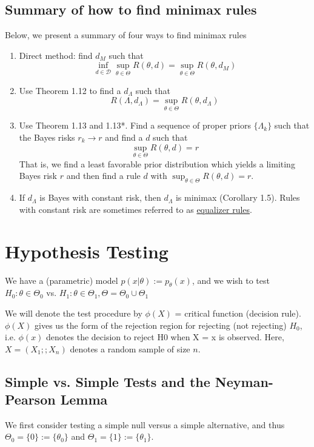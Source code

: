 \documentclass[12pt]{article}
\numberwithin{equation}{section}
\begin{document}
\subsection{Summary of how to find minimax rules}
Below, we present a summary of four ways to find minimax rules
\begin{enumerate}
  \item Direct method: find $d_M$ such that
  \begin{equation*}
    \inf_{d \in \mathcal{D}} \sup_{\theta \in \Theta} R(\theta, d)
      = \sup_{\theta \in \Theta} R(\theta, d_M)
  \end{equation*}
  \item Use Theorem 1.12 to find a $d_{\Lambda}$ such that
  \begin{equation*}
    R(\Lambda, d_{\Lambda}) = \sup_{\theta \in \Theta} R(\theta, d_{\Lambda})
  \end{equation*}
  \item Use Theorem 1.13 and 1.13*. Find a sequence of proper priors $\{\Lambda_k \}$ such that the Bayes risks $r_k \to r$ and find a $d$ such that
  \begin{equation*}
    \sup_{\theta \in \Theta} R(\theta, d) = r
  \end{equation*}
  That is, we find a least favorable prior distribution which yields a limiting Bayes risk $r$ and then find a rule $d$ with $\sup_{\theta \in \Theta} R(\theta, d) = r$. 
  \item If $d_{\Lambda}$ is Bayes with constant risk, then $d_{\Lambda}$ is minimax (Corollary 1.5). Rules with constant risk are sometimes referred to as \underline{equalizer rules}. 
\end{enumerate}

\newpage
\section{Hypothesis Testing}
We have a (parametric) model $p(x|\theta) :=  p_\theta(x)$, and we wish to test $H_0 : \theta \in \Theta_0$ vs. $H_1: \theta \in \Theta_1, \Theta = \Theta_0 \cup \Theta_1$

We will denote the test procedure by $\phi(X)$ = critical function (decision rule). $\phi(X)$ gives us the form of the rejection region for rejecting (not rejecting) $H_0$, i.e. $\phi(x)$
denotes the decision to reject H0 when X = x is observed. Here, 
$X = (X_1;    ; X_n)$ denotes a random sample of size $n$.

\subsection{Simple vs. Simple Tests and the Neyman-Pearson Lemma}
We first consider testing a simple null versus a simple alternative, and thus $\Theta_0 = \{0\} := \{\theta_0\}$ and 
$\Theta_1 = \{1\} := \{\theta_1\}$.
\end{document}
